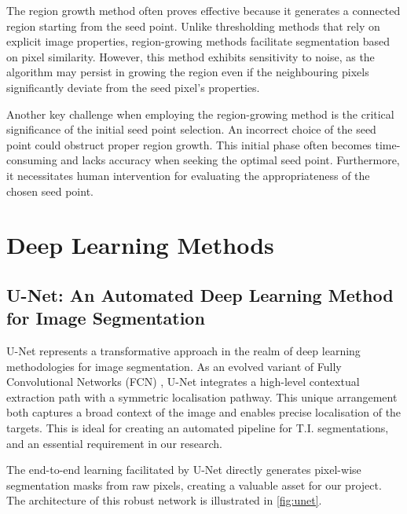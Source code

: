 The region growth method often proves effective because it generates a connected region starting from the seed point. Unlike thresholding methods that rely on explicit image properties, region-growing methods facilitate segmentation based on pixel similarity. However, this method exhibits sensitivity to noise, as the algorithm may persist in growing the region even if the neighbouring pixels significantly deviate from the seed pixel's properties.

Another key challenge when employing the region-growing method is the critical significance of the initial seed point selection. An incorrect choice of the seed point could obstruct proper region growth. This initial phase often becomes time-consuming and lacks accuracy when seeking the optimal seed point. Furthermore, it necessitates human intervention for evaluating the appropriateness of the chosen seed point.

\section{Deep Learning Methods}
\subsection{U-Net: An Automated Deep Learning Method for Image Segmentation}

U-Net \cite{ronneberger2015u} represents a transformative approach in the realm of deep learning methodologies for image segmentation. As an evolved variant of Fully Convolutional Networks (FCN) \cite{long2015fully}, U-Net integrates a high-level contextual extraction path with a symmetric localisation pathway. This unique arrangement both captures a broad context of the image and enables precise localisation of the targets. This is ideal for creating an automated pipeline for T.I. segmentations, and an essential requirement in our research. 

The end-to-end learning facilitated by U-Net directly generates pixel-wise segmentation masks from raw pixels, creating a valuable asset for our project. The architecture of this robust network is illustrated in \autoref{fig:unet}.


